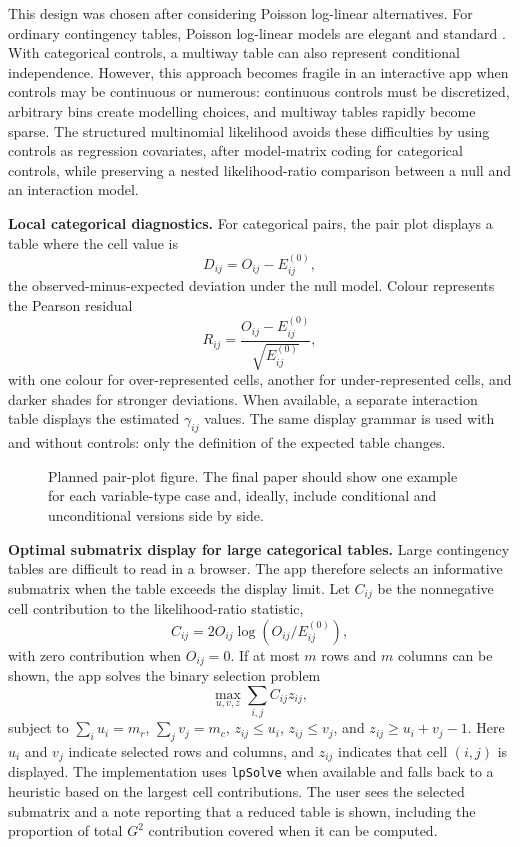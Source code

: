 \documentclass[preprint,12pt,a4paper]{elsarticle}
\begin{document}
This design was chosen after considering Poisson log-linear alternatives. For ordinary contingency tables, Poisson log-linear models are elegant and standard \cite{agresti2013,nelder1972}. With categorical controls, a multiway table can also represent conditional independence. However, this approach becomes fragile in an interactive app when controls may be continuous or numerous: continuous controls must be discretized, arbitrary bins create modelling choices, and multiway tables rapidly become sparse. The structured multinomial likelihood avoids these difficulties by using controls as regression covariates, after model-matrix coding for categorical controls, while preserving a nested likelihood-ratio comparison between a null and an interaction model.

\textbf{Local categorical diagnostics.} For categorical pairs, the pair plot displays a table where the cell value is
\[
D_{ij}=O_{ij}-E^{(0)}_{ij},
\]
the observed-minus-expected deviation under the null model. Colour represents the Pearson residual
\[
R_{ij}=\frac{O_{ij}-E^{(0)}_{ij}}{\sqrt{E^{(0)}_{ij}}},
\]
with one colour for over-represented cells, another for under-represented cells, and darker shades for stronger deviations. When available, a separate interaction table displays the estimated $\gamma_{ij}$ values. The same display grammar is used with and without controls: only the definition of the expected table changes.

\begin{figure}[!ht]
\centering
{}
\caption{Planned pair-plot figure. The final paper should show one example for each variable-type case and, ideally, include conditional and unconditional versions side by side.}
\label{fig:pairplots}
\end{figure}

\textbf{Optimal submatrix display for large categorical tables.} Large contingency tables are difficult to read in a browser. The app therefore selects an informative submatrix when the table exceeds the display limit. Let $C_{ij}$ be the nonnegative cell contribution to the likelihood-ratio statistic,
\[
C_{ij}=2O_{ij}\log(O_{ij}/E^{(0)}_{ij}),
\]
with zero contribution when $O_{ij}=0$. If at most $m$ rows and $m$ columns can be shown, the app solves the binary selection problem
\[
\max_{u,v,z}\sum_{i,j} C_{ij}z_{ij},
\]
subject to $\sum_i u_i=m_r$, $\sum_j v_j=m_c$, $z_{ij}\leq u_i$, $z_{ij}\leq v_j$, and $z_{ij}\geq u_i+v_j-1$. Here $u_i$ and $v_j$ indicate selected rows and columns, and $z_{ij}$ indicates that cell $(i,j)$ is displayed. The implementation uses \texttt{lpSolve} when available and falls back to a heuristic based on the largest cell contributions. The user sees the selected submatrix and a note reporting that a reduced table is shown, including the proportion of total $G^2$ contribution covered when it can be computed.
\end{document}
